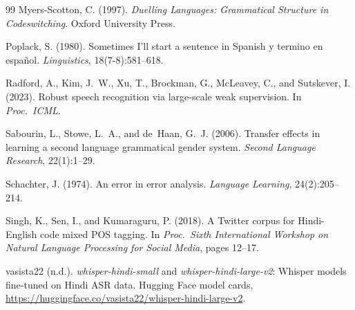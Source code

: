 \documentclass[11pt,a4paper]{report}
\begin{document}
\begin{thebibliography}{99}
Myers-Scotton, C. (1997).
\newblock \textit{Duelling Languages: Grammatical Structure in Codeswitching}.
\newblock Oxford University Press.

Poplack, S. (1980).
\newblock Sometimes I'll start a sentence in Spanish y termino en espa{\~n}ol.
\newblock \textit{Linguistics}, 18(7-8):581--618.

Radford, A., Kim, J.~W., Xu, T., Brockman, G., McLeavey, C., and Sutskever, I. (2023).
\newblock Robust speech recognition via large-scale weak supervision.
\newblock In \textit{Proc.\ ICML}.

Sabourin, L., Stowe, L.~A., and de~Haan, G.~J. (2006).
\newblock Transfer effects in learning a second language grammatical gender system.
\newblock \textit{Second Language Research}, 22(1):1--29.

Schachter, J. (1974).
\newblock An error in error analysis.
\newblock \textit{Language Learning}, 24(2):205--214.

Singh, K., Sen, I., and Kumaraguru, P. (2018).
\newblock A Twitter corpus for Hindi-English code mixed POS tagging.
\newblock In \textit{Proc.\ Sixth International Workshop on Natural Language Processing for Social Media}, pages 12--17.

vasista22 (n.d.).
\newblock \textit{whisper-hindi-small} and \textit{whisper-hindi-large-v2}: Whisper models fine-tuned on Hindi ASR data.
\newblock Hugging Face model cards, \url{https://huggingface.co/vasista22/whisper-hindi-large-v2}.

\end{thebibliography}
\end{document}
